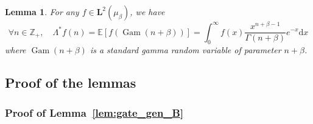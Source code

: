\documentclass[10pt]{amsart}
\newtheorem{lemm}[theo]{Lemma}\newtheorem{prop}[theo]{Proposition}\newtheorem{coro}[theo]{Corollary}\newtheorem{conj}[theo]{Conjecture}
\theoremstyle{definition}\newtheorem{defi}[theo]{Definition}\newtheorem{rema}[theo]{Remark}\newtheorem{exam}[theo]{Example}\newtheorem{exem}[theo]{Example}\newtheorem{nota}[theo]{Notation}
\DeclareMathOperator{\Gam}{Gam}
\newcommand{\EE}{\mathbb{E}}
\newcommand{\ZZ}{\mathbb{Z}}
\newcommand{\iy}{\infty}
\newcommand{\esL}{\mathbf{L}}
\newcommand{\adjL}{\Lambda^*}
\let\oldforall\forall
\renewcommand*{\forall}{\mathrel{\oldforall}}
\newcommand*{\dd}{\mathrm{d}}
\newcommand*{\dx}{\dd x}
\begin{document}
\begin{lemm}\label{lem:tildeL}
For any $f\in\esL^2(\mu_{\beta})$, we have
\[
\forall n\in\ZZ_+,\quad \adjL f(n)=\EE[f(\Gam(n+\beta))]=\int_0^{\iy} f(x)\frac{x^{n+\beta-1}}{\Gamma(n+\beta)}e^{-x}\dx
\]
where $\Gam(n+\beta)$ is a standard gamma random variable of parameter $n+\beta$.
\end{lemm}

\subsection{Proof of the lemmas}

\subsubsection{Proof of Lemma~\ref{lem:gate_gen_B}}
\end{document}
